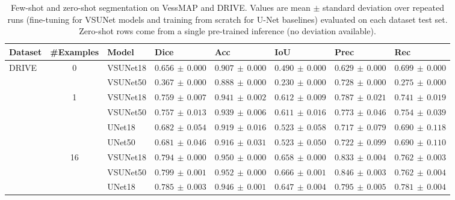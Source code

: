 \documentclass[%
reprint,
nofootinbib,
 amsmath,amssymb,
aps,
superscriptaddress,
showkeys,
longbibliography
]{revtex4-1}
\begin{document}
\begin{table}[t]
    \caption{Few-shot and zero-shot segmentation on VessMAP and DRIVE. Values are mean $\pm$ standard deviation over repeated runs (fine-tuning for VSUNet models and training from scratch for U-Net baselines) evaluated on each dataset test set. Zero-shot rows come from a single pre-trained inference (no deviation available).}
    \label{tab:combined_fewshot}
    \centering
    \begingroup
    \small
    \setlength{\tabcolsep}{4pt}
    \renewcommand{\arraystretch}{1.15}
    \begin{tabular}{l c l l l l l l}
        \hline
        \textbf{Dataset} & \textbf{\#Examples} & \textbf{Model} & \textbf{Dice} & \textbf{Acc} & \textbf{IoU} & \textbf{Prec} & \textbf{Rec} \\
        \hline
        \multirow{10}{*}{DRIVE} & \multirow{2}{*}{0} & VSUNet18 & $0.656 \,\pm\, 0.000$ & $0.907 \,\pm\, 0.000$ & $0.490 \,\pm\, 0.000$ & $0.629 \,\pm\, 0.000$ & $0.699 \,\pm\, 0.000$ \\
         &  & VSUNet50 & $0.367 \,\pm\, 0.000$ & $0.888 \,\pm\, 0.000$ & $0.230 \,\pm\, 0.000$ & $0.728 \,\pm\, 0.000$ & $0.275 \,\pm\, 0.000$ \\
         \cline{2-8}
         & \multirow{4}{*}{1} & VSUNet18 & $0.759 \,\pm\, 0.007$ & $0.941 \,\pm\, 0.002$ & $0.612 \,\pm\, 0.009$ & $0.787 \,\pm\, 0.021$ & $0.741 \,\pm\, 0.019$ \\
         &  & VSUNet50 & $0.757 \,\pm\, 0.013$ & $0.939 \,\pm\, 0.006$ & $0.611 \,\pm\, 0.016$ & $0.773 \,\pm\, 0.046$ & $0.754 \,\pm\, 0.039$ \\
         &  & UNet18 & $0.682 \,\pm\, 0.054$ & $0.919 \,\pm\, 0.016$ & $0.523 \,\pm\, 0.058$ & $0.717 \,\pm\, 0.079$ & $0.690 \,\pm\, 0.118$ \\
         &  & UNet50 & $0.681 \,\pm\, 0.046$ & $0.916 \,\pm\, 0.031$ & $0.523 \,\pm\, 0.050$ & $0.722 \,\pm\, 0.099$ & $0.690 \,\pm\, 0.110$ \\
         \cline{2-8}
         & \multirow{4}{*}{16} & VSUNet18 & $0.794 \,\pm\, 0.000$ & $0.950 \,\pm\, 0.000$ & $0.658 \,\pm\, 0.000$ & $0.833 \,\pm\, 0.004$ & $0.762 \,\pm\, 0.003$ \\
         &  & VSUNet50 & $0.799 \,\pm\, 0.001$ & $0.952 \,\pm\, 0.000$ & $0.666 \,\pm\, 0.001$ & $0.846 \,\pm\, 0.003$ & $0.762 \,\pm\, 0.004$ \\
         &  & UNet18 & $0.785 \,\pm\, 0.003$ & $0.946 \,\pm\, 0.001$ & $0.647 \,\pm\, 0.004$ & $0.795 \,\pm\, 0.005$ & $0.781 \,\pm\, 0.004$ \\

\end{tabular}
\end{table}
\end{document}

